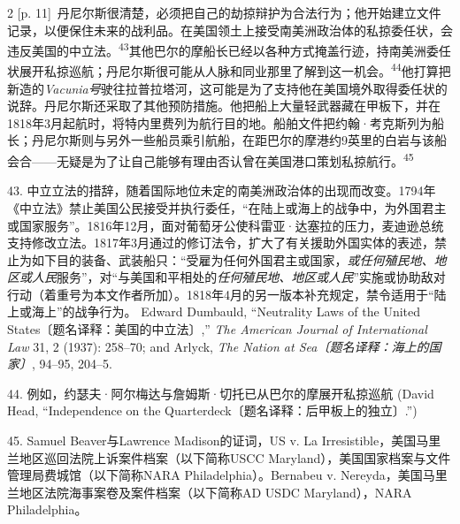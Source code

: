 \documentclass[10pt,a4paper]{article}
\begin{document}
\begin{paracol}{2}
{\scriptsize\color{gray} [p. 11]}\ 丹尼尔斯很清楚，必须把自己的劫掠辩护为合法行为；他开始建立文件记录，以便保住未来的战利品。在美国领土上接受南美洲政治体的私掠委任状，会违反美国的中立\mbox{法。\textsuperscript{43}}其他巴尔的摩船长已经以各种方式掩盖行迹，持南美洲委任状展开私掠巡航；丹尼尔斯很可能从人脉和同业那里了解到这一机\mbox{会。\textsuperscript{44}}他打算把新造的\textit{Vacunia号}驶往拉普拉塔河，这可能是为了支持他在美国境外取得委任状的说辞。丹尼尔斯还采取了其他预防措施。他把船上大量轻武器藏在甲板下，并在1818年3月起航时，将特内里费列为航行目的地。船舶文件把约翰·考克斯列为船长；丹尼尔斯则与另外一些船员乘引航船，在距巴尔的摩港约9英里的白岩与该船会合——无疑是为了让自己能够有理由否认曾在美国港口策划私掠航\mbox{行。\textsuperscript{45}}\par{\small 43. 中立立法的措辞，随着国际地位未定的南美洲政治体的出现而改变。1794年《中立法》禁止美国公民接受并执行委任，“在陆上或海上的战争中，为外国君主或国家服务”。1816年12月，面对葡萄牙公使科雷亚·达塞拉的压力，麦迪逊总统支持修改立法。1817年3月通过的修订法令，扩大了有关援助外国实体的表述，禁止为如下目的装备、武装船只：“受雇为任何外国君主或国家，\textit{或任何殖民地、地区或人民}服务”，对“与美国和平相处的\textit{任何殖民地、地区或人民}”实施或协助敌对行动（着重号为本文作者所加）。1818年4月的另一版本补充规定，禁令适用于“陆上或海上”的战争行为。 Edward Dumbauld, “Neutrality Laws of the United States〔题名译释：美国的中立法〕,” \textit{The American Journal of International Law} 31, 2 (1937): 258–70; and Arlyck, \textit{The Nation at Sea〔题名译释：海上的国家〕}, 94–95, 204–5.\par}{\small 44. 例如，约瑟夫·阿尔梅达与詹姆斯·切托已从巴尔的摩展开私掠巡航 (David Head, “Independence on the Quarterdeck〔题名译释：后甲板上的独立〕.”)\par}{\small 45. Samuel Beaver与Lawrence Madison的证词，US v. La Irresistible，美国马里兰地区巡回法院上诉案件档案（以下简称USCC Maryland），美国国家档案与文件管理局费城馆（以下简称NARA Philadelphia）。Bernabeu v. Nereyda，美国马里兰地区法院海事案卷及案件档案（以下简称AD USDC Maryland），NARA Philadelphia。\par}
\switchcolumn

\end{paracol}
\end{document}
